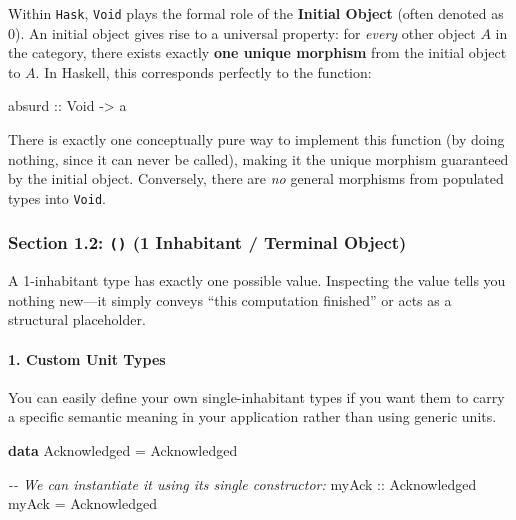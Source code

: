 \documentclass[
]{article}
\newenvironment{Shaded}{}{}
\newcommand{\CommentTok}[1]{\textcolor[rgb]{0.38,0.63,0.69}{\textit{#1}}}
\newcommand{\DataTypeTok}[1]{\textcolor[rgb]{0.56,0.13,0.00}{#1}}
\newcommand{\KeywordTok}[1]{\textcolor[rgb]{0.00,0.44,0.13}{\textbf{#1}}}
\newcommand{\NormalTok}[1]{#1}
\newcommand{\OtherTok}[1]{\textcolor[rgb]{0.00,0.44,0.13}{#1}}
\begin{document}
Within \texttt{Hask}, \texttt{Void} plays the formal role of the
\textbf{Initial Object} (often denoted as \(0\)). An initial object
gives rise to a universal property: for \emph{every} other object \(A\)
in the category, there exists exactly \textbf{one unique morphism} from
the initial object to \(A\). In Haskell, this corresponds perfectly to
the function:

\begin{Shaded}
\begin{Highlighting}[]
\OtherTok{absurd ::} \DataTypeTok{Void} \OtherTok{{-}\textgreater{}}\NormalTok{ a}
\end{Highlighting}
\end{Shaded}

There is exactly one conceptually pure way to implement this function
(by doing nothing, since it can never be called), making it the unique
morphism guaranteed by the initial object. Conversely, there are
\emph{no} general morphisms from populated types into \texttt{Void}.

\subsubsection{\texorpdfstring{Section 1.2: \texttt{()} (1 Inhabitant /
Terminal
Object)}{Section 1.2: () (1 Inhabitant / Terminal Object)}}\label{section-1.2-1-inhabitant-terminal-object}

A 1-inhabitant type has exactly one possible value. Inspecting the value
tells you nothing new---it simply conveys ``this computation finished''
or acts as a structural placeholder.

\paragraph{1. Custom Unit Types}\label{custom-unit-types}

You can easily define your own single-inhabitant types if you want them
to carry a specific semantic meaning in your application rather than
using generic units.

\begin{Shaded}
\begin{Highlighting}[]
\KeywordTok{data} \DataTypeTok{Acknowledged} \OtherTok{=} \DataTypeTok{Acknowledged}

\CommentTok{{-}{-} We can instantiate it using its single constructor:}
\OtherTok{myAck ::} \DataTypeTok{Acknowledged}
\NormalTok{myAck }\OtherTok{=} \DataTypeTok{Acknowledged}
\end{Highlighting}
\end{Shaded}
\end{document}
